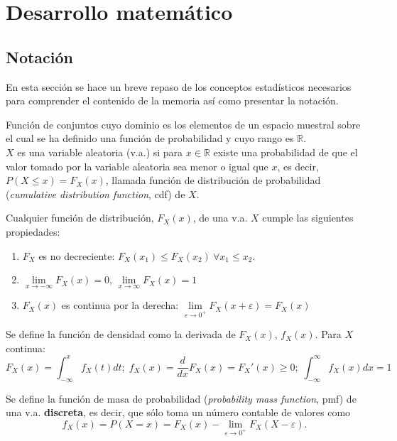 \chapter{Desarrollo matemático}

\section{Notación}

	En esta sección se hace un breve repaso de los 
conceptos estadísticos necesarios para comprender el 
contenido de la memoria así como presentar la notación.
	
\begin{definicion}
	Función de conjuntos cuyo dominio es los elementos de un 
espacio muestral sobre el cual se ha definido una función de
probabilidad y cuyo rango es $\mathbb{R}$.\\
	$X$ es una variable aleatoria (v.a.) si para $x \in 
\mathbb{R}$ existe una probabilidad de que el valor tomado 
por la variable aleatoria sea menor o igual que $x$, es
decir, $P(X \leq x) = F_X (x)$, llamada función de
distribución de probabilidad (\textit{cumulative distribution
function}, cdf) de $X$.	
\end{definicion}

	Cualquier función de distribución, $F_X(x)$, de una v.a.
$X$ cumple las siguientes propiedades:
 
\begin{enumerate}
	\item $F_X$ es no decreciente: 
			$F_X(x_1) \leq F_X(x_2) \ \forall x_1 \leq x_2$.
	\item $\underset{x \rightarrow -\infty}{\lim} F_X(x) =
			 0$,
			$\underset{x \rightarrow \infty}{\lim} F_X(x) =
			 1$
	\item $F_X(x)$ es continua por la derecha: 
		$\underset{\varepsilon \rightarrow 0^+}{\lim} 
		F_X(x+\varepsilon) = F_X(x)$
\end{enumerate}
	
\begin{definicion}
	Se define la función de densidad como la derivada de 
$F_X(x)$, $f_X(x)$. Para $X$ continua:
	\[ 
		F_X(x) = \int_{-\infty}^x f_X(t) dt; \;
		f_X(x) = \frac{d}{dx}F_X(x) = F_X'(x) \geq 0; \;
		\int_{-\infty}^{\infty} f_X(x) dx = 1 
	\]
\end{definicion}
	
\begin{definicion}
	Se define la función de masa de probabilidad  
(\textit{probability mass function}, pmf) de una v.a. 
\textbf{discreta}, es decir, que sólo toma un número contable 
de valores como
	\[ 
		f_X(x) = P(X=x) = 
		F_X(x) - 
			\lim_{\varepsilon \rightarrow 0^+} 
				F_X(X-\varepsilon).
	\]
\end{definicion}

